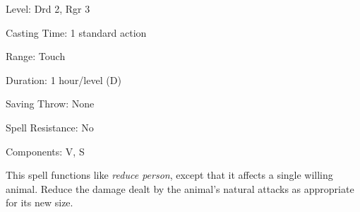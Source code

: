 
\begin{description*}
\item[Level:] Drd 2, Rgr 3
\item[Casting Time:] 1 standard action
\item[Range:] Touch
\item[Duration:] 1 hour/level (D)
\item[Saving Throw:] None
\item[Spell Resistance:] No
\item[Components:] V, S
\end{description*}

This spell functions like \textit{reduce person}, except that it affects a single
willing animal. Reduce the damage dealt by the animal's natural attacks as appropriate
for its new size.
